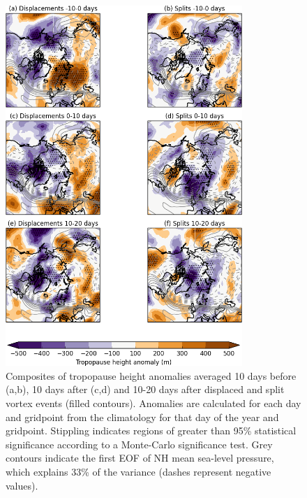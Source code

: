 \begin{figure}
 \centering
 \noindent\includegraphics[width=0.8\textwidth]{figures/chapter-moments/tropopause_height_composites_nam_crop.png}
 \caption[Tropopause height composites for split and displaced vortex
 events.]{Composites of tropopause height anomalies averaged 10 days before
   (a,b), 10 days after (c,d) and 10-20 days after displaced and split vortex
   events (filled contours). Anomalies are calculated for each day and gridpoint
   from the climatology for that day of the year and gridpoint. Stippling
   indicates regions of greater than 95\% statistical significance according to
   a Monte-Carlo significance test. Grey contours indicate the first EOF of NH
   mean sea-level pressure, which explains 33\% of the variance (dashes
   represent negative values).}
 \label{fig:tropopause_height}
\end{figure}

